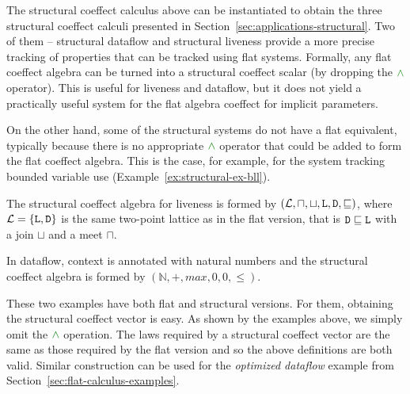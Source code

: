 The structural coeffect calculus above can be instantiated to obtain the three structural coeffect calculi
presented in Section~\ref{sec:applications-structural}. Two of them -- structural dataflow and
structural liveness provide a more precise tracking of properties that can be tracked using
flat systems. Formally, any flat coeffect algebra can be turned into a structural coeffect scalar
(by dropping the $\czip$ operator). This is useful for liveness and dataflow, but it does not yield
a practically useful system for the flat algebra coeffect for implicit parameters.

On the other hand, some of the structural systems do not have a flat equivalent, typically
because there is no appropriate $\czip$ operator that could be added to form the flat coeffect
algebra. This is the case, for example, for the system tracking bounded variable use
(Example~\ref{ex:structural-ex-bll}).

\begin{example}
The structural coeffect algebra for liveness is formed by
$(\mathcal{L}, \sqcap, \sqcup, \textnormal{\ttfamily L}, \textnormal{\ttfamily D}, \sqsubseteq)$, where $\mathcal{L}=\{ \ident{L}, \ident{D} \}$ is
the same two-point lattice as in the flat version, that is $\textnormal{\ttfamily D} \sqsubseteq \textnormal{\ttfamily L}$
with a join $\sqcup$ and a meet $\sqcap$.
\end{example}

\begin{example}
In dataflow, context is annotated with natural numbers and the structural coeffect algebra is formed
by $(\mathbb{N}, +, \mathit{max}, 0, 0, \leq)$.
\end{example}

\noindent
These two examples have both flat and structural versions. For them, obtaining the structural
coeffect vector is easy. As shown by the examples above, we simply omit the $\czip$ operation. The
laws required by a structural coeffect vector are the same as those required by the flat version
and so the above definitions are both valid. Similar construction can be used for the
\emph{optimized dataflow} example from Section~\ref{sec:flat-calculus-examples}.

